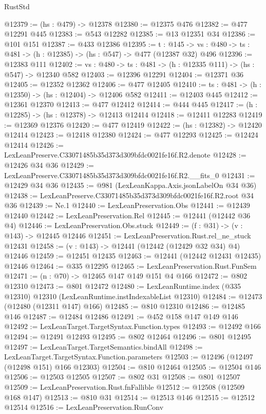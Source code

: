 \begin{lexlean}{RustStd}
\begin{coremodule}
@12379 := (hs : @479) -> @12378
@12380 := @12375 @476
@12382 := @477 @12291 @445
@12383 := @543 @12282
@12385 := @13 @12351 @34
@12386 := @101 @151
@12387 := @433 @12386
@12395 := {t : @145} ->
  {vs : @480} -> {ts : @481} -> (h : @12385) -> (hs : @547) -> @477 (@12387 @32) @496
@12396 := @12383 @111
@12402 := {vs : @480} -> {ts : @481} -> (h : @12335 @111) -> (hs : @547) -> @12340 @582
@12403 := @12396 @12291
@12404 := @12371 @36
@12405 := @12352 @12362
@12406 := @477 @12405
@12410 := {ts : @481} -> (h : @12350) -> (hs : @12404) -> @12406 @582
@12411 := @12403 @445
@12412 := @12361 @12370
@12413 := @477 @12412
@12414 := @444 @445
@12417 := (h : @12285) -> (hs : @12378) -> @12413 @12414
@12418 := @12411 @12283
@12419 := @12369 @12376
@12420 := @477 @12419
@12422 := (hs : @12382) -> @12420 @12414
@12423 := @12418 @12380
@12424 := @477 @12293
@12425 := @12424 @12414
@12426 := LexLeanPreserve.C33071485b35d373d309bfdc0021fe16f.R2.denote
@12428 := @12426 @34 @36
@12429 := LexLeanPreserve.C33071485b35d373d309bfdc0021fe16f.R2.__fits_0
@12431 := @12429 @34 @36
@12435 := @981 (LexLeanKappa.Axis.jsonLabelOn @34 @36)
@12438 := LexLeanPreserve.C33071485b35d373d309bfdc0021fe16f.R2.root @34 @36
@12439 := Ne.{1}
@12440 := LexLeanPreservation.Obs
@12441 := @12439 @12440
@12442 := LexLeanPreservation.Rel
@12445 := @12441 (@12442 @36 @4)
@12446 := LexLeanPreservation.Obs.stuck
@12449 := (f : @31) -> (v : @143) -> @12445 @12446
@12451 := LexLeanPreservation.Rust.rel_ne_stuck @12431
@12458 := (v : @143) -> @12441 (@12442 (@12429 @32 @34) @4) @12446
@12459 := @12451 @12435
@12463 := @12441 (@12442 @12431 @12435) @12446
@12464 := @335 @12295
@12465 := LexLeanPreservation.Rust.FunSem
@12471 := (n : @70) -> @12465 @147 @149 @151 @4 @166
@12472 := @802 @12310
@12473 := @801 @12472
@12480 := LexLeanRuntime.index (@335 @12310) @12310 (LexLeanRuntime.instIndexableList @12310)
@12484 := @12473 (@12480 (@12311 @147) @166)
@12485 := @810 @12310
@12486 := @12485 @146
@12487 := @12484 @12486
@12491 := @452 @158 @147 @149 @146
@12492 := LexLeanTarget.TargetSyntax.Function.types
@12493 := @12492 @166
@12494 := @12491 @12493
@12495 := @802 @12464
@12496 := @801 @12495
@12497 := LexLeanTarget.TargetSemantics.bindAll
@12498 := LexLeanTarget.TargetSyntax.Function.parameters
@12503 := @12496 (@12497 (@12498 @151) @166 @12303)
@12504 := @810 @12464
@12505 := @12504 @146
@12506 := @12503 @12505
@12507 := @802 @31
@12508 := @801 @12507
@12509 := LexLeanPreservation.Rust.fnFallible
@12512 := @12508 (@12509 @168 @147)
@12513 := @810 @31
@12514 := @12513 @146
@12515 := @12512 @12514
@12516 := LexLeanPreservation.RunConv

\end{coremodule}
\end{lexlean}

